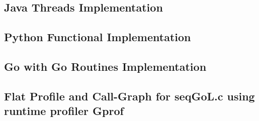 \documentclass[11pt]{article} %
\begin{document}
\subsection{Java Threads Implementation}

\pagebreak
\subsection{Python Functional Implementation}

\pagebreak
\subsection{Go with Go Routines Implementation}

\pagebreak
\subsection{Flat Profile and Call-Graph for seqGoL.c using runtime profiler Gprof}
\begingroup
\fontsize{10pt}{8pt}
\end{document}
